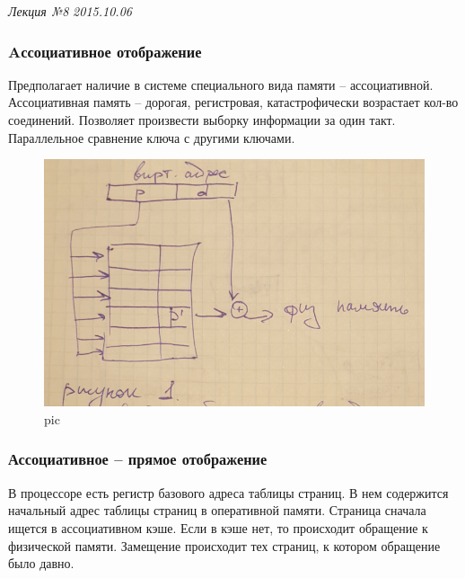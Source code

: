 \clearpage
\begin{flushright}
	\textit{Лекция №8}
	\textit{2015.10.06}
\end{flushright}

\subsubsection{Aссоциативное отображение}

Предполагает наличие в системе специального вида памяти – ассоциативной. Ассоциативная память – дорогая, регистровая, катастрофически возрастает кол-во соединений. Позволяет произвести выборку информации за один такт. Параллельное сравнение ключа с другими ключами.

\begin{figure}[H]
    \centering
    \includegraphics[width=\textwidth]{pic/1.png}
    \caption{pic}
\end{figure}

\subsubsection{Ассоциативное – прямое отображение}
В процессоре есть регистр базового адреса таблицы страниц. В нем содержится начальный адрес таблицы страниц в оперативной памяти. Страница сначала ищется в ассоциативном кэше. Если в кэше нет, то происходит обращение к физической памяти. Замещение происходит тех страниц, к котором обращение было давно. 

